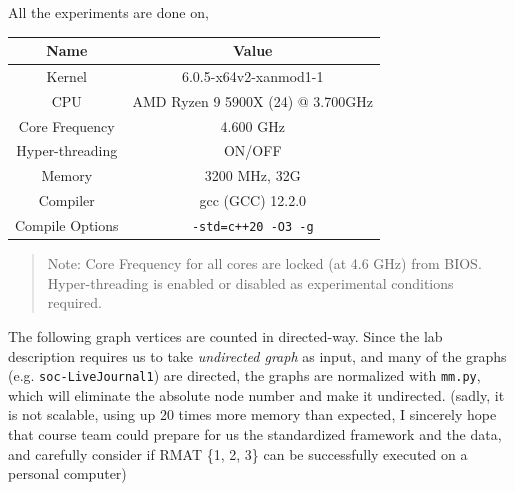 \documentclass[12pt]{article}
\begin{document}
All the experiments are done on,
\begin{table}[h!]
	\centering
	\begin{tabular}{ c | c }
		\textbf{Name}   & \textbf{Value}                    \\
		\hline\hline
		Kernel          & 6.0.5-x64v2-xanmod1-1             \\
		CPU             & AMD Ryzen 9 5900X (24) @ 3.700GHz \\
		Core Frequency  & 4.600 GHz                         \\
		Hyper-threading & ON/OFF                            \\
		Memory          & 3200 MHz, 32G                     \\
		Compiler        & gcc (GCC) 12.2.0                  \\
		Compile Options & \texttt{-std=c++20 -O3 -g}        \\
	\end{tabular}
\end{table}
\begin{quote}
	Note: Core Frequency for all cores are locked (at 4.6 GHz) from BIOS. Hyper-threading is enabled or disabled as experimental conditions required.
\end{quote}

The following graph vertices are counted in directed-way. Since the lab description requires us to take \textit{undirected graph} as input, and many of the graphs (e.g. \texttt{soc-LiveJournal1}) are directed, the graphs are normalized with \texttt{mm.py}, which will eliminate the absolute node number and make it undirected. (sadly, it is not scalable, using up 20 times more memory than expected, I sincerely hope that course team could prepare for us the standardized framework and the data, and carefully consider if RMAT \{1, 2, 3\} can be successfully executed on a personal computer)
\end{document}
